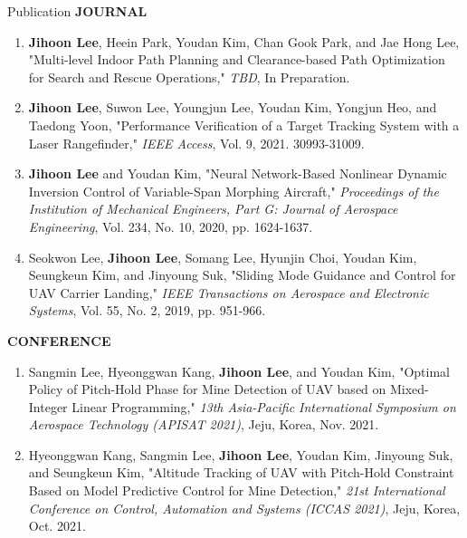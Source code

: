 \documentclass{resume} %
\begin{document}

\begin{rSection}{Publication}
	\textbf{JOURNAL}
	\begin{enumerate}\renewcommand{\labelenumi}{[J.\theenumi]}
		\item \textbf{Jihoon Lee}, Heein Park, Youdan Kim, Chan Gook Park, and Jae Hong Lee, "Multi-level Indoor Path Planning and Clearance-based Path Optimization for Search and Rescue Operations," \textit{TBD}, In Preparation.
		
		\item \textbf{Jihoon Lee}, Suwon Lee, Youngjun Lee, Youdan Kim, Yongjun Heo, and Taedong Yoon, "Performance Veriﬁcation of a Target Tracking System with a Laser Rangeﬁnder," \textit{IEEE Access}, Vol. 9, 2021. 30993-31009.  
		
		\item \textbf{Jihoon Lee} and Youdan Kim, "Neural Network-Based Nonlinear Dynamic Inversion Control of Variable-Span Morphing Aircraft," \textit{Proceedings of the Institution of Mechanical Engineers, Part G: Journal of Aerospace Engineering}, Vol. 234, No. 10, 2020, pp. 1624-1637. \newline[DOI: 10.1177/0954410019846713]
		
		\item Seokwon Lee, \textbf{Jihoon Lee}, Somang Lee, Hyunjin Choi, Youdan Kim, Seungkeun Kim, and Jinyoung Suk, "Sliding Mode Guidance and Control for UAV Carrier Landing," \textit{IEEE Transactions on Aerospace and Electronic Systems}, Vol. 55, No. 2, 2019, pp. 951-966. 
	\end{enumerate}\renewcommand{\labelenumi}{\theenumi.}
	
	\textbf{CONFERENCE}
	\begin{enumerate}\renewcommand{\labelenumi}{[C.\theenumi]}
		
		\item Sangmin Lee, Hyeonggwan Kang, \textbf{Jihoon Lee}, and Youdan Kim, "Optimal Policy of Pitch-Hold Phase for Mine Detection of UAV based on Mixed-Integer Linear Programming," \textit{13th Asia-Pacific International Symposium on Aerospace Technology (APISAT 2021)}, Jeju, Korea, Nov. 2021. 
		
		\item Hyeonggwan Kang, Sangmin Lee, \textbf{Jihoon Lee}, Youdan Kim, Jinyoung Suk, and Seungkeun Kim, "Altitude Tracking of UAV with Pitch-Hold Constraint Based on Model Predictive Control for Mine Detection," \textit{21st International Conference on Control, Automation and Systems (ICCAS 2021)}, Jeju, Korea, Oct. 2021. 
		

\end{enumerate}
\end{rSection}
\end{document}
